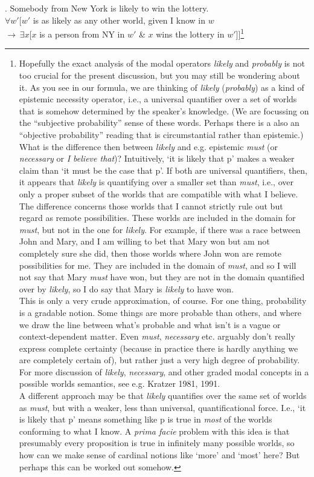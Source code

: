 \ex. \label{nyli} Somebody from New York is likely to win the lottery.\\
$\forall w'[w'$ is as likely as any other world, given I know in $w$\\
\null\hfill$ \rightarrow\ \exists x[x$ is a person from NY in $w'$ \& $x$ wins the lottery in $w'$]]\footnote{Hopefully the exact analysis of the modal operators \emph{likely} and \emph{probably} is not too crucial for the present discussion, but you may still be wondering about it. As you see in our formula, we are thinking of \emph{likely} (\emph{probably}) as a kind of epistemic necessity operator, i.e., a universal quantifier over a set of worlds that is somehow determined by the speaker's knowledge. (We are focussing on the ``subjective probability'' sense of these words. Perhaps there is a also an ``objective probability'' reading that is circumstantial rather than epistemic.) What is the difference then between \emph{likely} and e.g. epistemic \emph{must} (or \emph{necessary} or \emph{I believe that})? Intuitively, `it is likely that p' makes a weaker claim than `it must be the case that p'. If both are universal quantifiers, then, it appears that \emph{likely} is quantifying over a smaller set than \emph{must}, i.e., over only a proper subset of the worlds that are compatible with what I believe. The difference concerns those worlds that I cannot strictly rule out but regard as remote possibilities. These worlds are included in the domain for \emph{must}, but not in the one for \emph{likely}. For example, if there was a race between John and Mary, and I am willing to bet that Mary won but am not completely sure she did, then those worlds where John won are remote possibilities for me. They are included in the domain of \emph{must}, and so I will not say that Mary \emph{must} have won, but they are not in the domain quantified over by \emph{likely}, so I do say that Mary is \emph{likely} to have won.\\
\indent This is only a very crude approximation, of course. For one thing, probability is a gradable notion. Some things are more probable than others, and where we draw the line between what's probable and what isn't is a vague or context-dependent matter. Even \emph{must}, \emph{necessary} etc. arguably don't really express complete certainty (because in practice there is hardly anything we are completely certain of), but rather just a very high degree of probability. For more discussion of \emph{likely}, \emph{necessary}, and other graded modal concepts in a possible worlds semantics, see e.g. Kratzer 1981, 1991.\\
\indent A different approach may be that \emph{likely} quantifies over the same set of worlds as \emph{must}, but with a weaker, less than universal, quantificational force. I.e., `it is likely that p' means something like p is true in \emph{most} of the worlds conforming to what I know. A \emph{prima facie} problem with this idea is that presumably every proposition is true in infinitely many possible worlds, so how can we make sense of cardinal notions like `more' and `most' here? But perhaps this can be worked out somehow. }


